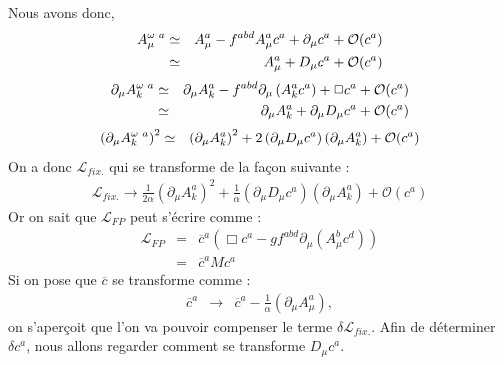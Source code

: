 \documentclass[a4paper,11pt]{article} %
\theoremstyle{plain}
\theoremstyle{definition}
\theoremstyle{remark}
\numberwithin{equation}{section}
\numberwithin{equation}{subsection}
\numberwithin{figure}{section}
\begin{document}
\noindent
Nous avons donc, 
\begin{eqnarray*}
 A^{\omega \hspace{1mm} a}_{\mu}    &\simeq&    A^{a}_{\mu} - f^{abd} A^{a}_{\mu} c^{a} + \partial_{\mu}c^{a}  + \mathcal{O} (c^{a})\\
                                    &\simeq&    A^{a}_{\mu}  + D_{\mu} c^{a} + \mathcal{O} (c^{a})
\end{eqnarray*}
\begin{eqnarray*}
 \partial_{\mu}  A^{\omega \hspace{1mm} a}_{k}    &\simeq&    \partial_{\mu} A^{a}_{k} - f^{abd}  \partial_{\mu} \left( A^{a}_{k} c^{a} \right) 
+ \Box c^{a} + \mathcal{O} (c^{a})  \\
                                                  &\simeq&     \partial_{\mu} A^{a}_{k}  + \partial_{\mu}D_{\mu} c^{a} + \mathcal{O} (c^{a})
\end{eqnarray*}
\begin{eqnarray*}
 \left( \partial_{\mu}  A^{\omega \hspace{1mm} a}_{k} \right)^{2} &\simeq&  \left( \partial_{\mu} A^{a}_{k} \right)^{2} 
+ 2 \left(  \partial_{\mu}D_{\mu} c^{a}  \right) \left( \partial_{\mu} A^{a}_{k} \right) + \mathcal{O} (c^{a})  
\end{eqnarray*}
On a donc  $\mathcal{L}_{fix.}$ qui se transforme de la façon suivante :
\begin{eqnarray*}
 \mathcal{L}_{fix.}  \rightarrow \frac{1}{2 \alpha} \left( \partial_{\mu} A^{a}_{k} \right)^{2} 
+ \frac{1}{\alpha} \left(  \partial_{\mu}D_{\mu} c^{a}  \right) \left( \partial_{\mu} A^{a}_{k} \right) + \mathcal{O} (c^{a})  
\end{eqnarray*}
Or on sait que  $\mathcal{L}_{FP}$ peut s'écrire comme :
\begin{eqnarray*}
 \mathcal{L}_{FP} &=&  \overline{c}^{a} \left( \Box c^{a} -g f^{abd} \partial_{\mu} \left( A^{b}_{\mu} c^{d} \right) \right) \\
                  &=&  \overline{c}^{a} M  c^{a}
\end{eqnarray*}
Si on pose que $\overline{c}$ se transforme comme :
\begin{eqnarray*}
 \overline{c}^{a} &\rightarrow& \overline{c}^{a} - \frac{1}{\alpha} \left( \partial_{\mu} A^{a}_{\mu} \right) ,
\end{eqnarray*}
on s'aperçoit que l'on va pouvoir compenser le terme $ \delta \mathcal{L}_{fix.} $.
Afin de déterminer  $ \delta c^{a} $, nous allons regarder comment se transforme $D_{\mu}c^{a}$.
\end{document}
